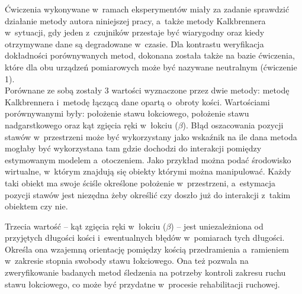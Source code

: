 Ćwiczenia wykonywane w~ramach eksperymentów miały za zadanie sprawdzić działanie metody autora niniejszej pracy, a~także metody Kalkbrennera w~sytuacji, gdy jeden z~czujników przestaje być wiarygodny oraz kiedy otrzymywane dane są degradowane w~czasie. Dla kontrastu weryfikacja dokładności porównywanych metod, dokonana została także na bazie ćwiczenia, które dla obu urządzeń pomiarowych może być nazywane neutralnym (ćwiczenie 1).\\

Porównane ze sobą zostały 3 wartości wyznaczone przez dwie metody: metodę Kalkbrennera i~metodę łączącą dane opartą o~obroty kości. Wartościami porównywanymi były: położenie stawu łokciowego, położenie stawu nadgarstkowego oraz kąt zgięcia ręki w~łokciu ($\beta$). Błąd oszacowania pozycji stawów w~przestrzeni może być wykorzystany jako wskaźnik na ile dana metoda mogłaby być wykorzystana tam gdzie dochodzi do interakcji pomiędzy estymowanym modelem a~otoczeniem. Jako przykład można podać środowisko wirtualne, w~którym znajdują się obiekty którymi można manipulować. Każdy taki obiekt ma swoje ściśle określone położenie w~przestrzeni, a~estymacja pozycji stawów jest niezędna żeby określić czy doszło już do interakcji z~takim obiektem czy nie.
 
 
Trzecia wartość -- kąt zgięcia ręki w~łokciu ($\beta$) -- jest uniezależniona od przyjętych długości kości i~ewentualnych błędów w~pomiarach tych długości. Określa ona wzajemną orientację pomiędzy kością przedramienia a~ramieniem w~zakresie stopnia swobody stawu łokciowego. Ona też pozwala na zweryfikowanie badanych metod śledzenia na potrzeby kontroli zakresu ruchu stawu łokciowego, co może być przydatne w~procesie rehabilitacji ruchowej. \\ 

